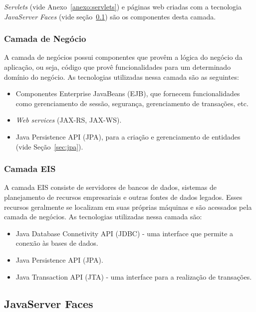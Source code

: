 \documentclass[
  10.5pt,				  %
	openright,			%
	twoside,			  %
  a5paper,
  chapter=TITLE,	%
	section=TITLE,	%
  hyphens,        %
	english,        %
	brazil          %
]{abntex2}
\begin{document}
\emph{Servlets} (vide Anexo~\ref{anexo:servlets}) e páginas web criadas com a tecnologia \emph{JavaServer Faces} (vide seção~\ref{sec:jsf}) são os componentes desta camada. 


\subsubsection{Camada de Negócio}\label{sec:camada-negocio}
A camada de negócios possui componentes que provêm a lógica do negócio da aplicação, ou seja, código que provê funcionalidades para um determinado domínio do negócio. As tecnologias utilizadas nessa camada são as seguintes:
\begin{itemize}
  \item Componentes Enterprise JavaBeans (EJB), que fornecem funcionalidades como gerenciamento de sessão, segurança, gerenciamento de transações, etc.
  \item \emph{Web services} (JAX-RS, JAX-WS).
  \item Java Persistence API (JPA), para a criação e gerenciamento de entidades (vide Seção~\ref{sec:jpa}).
\end{itemize}


\subsubsection{Camada EIS}

A camada EIS consiste de servidores de bancos de dados, sistemas de planejamento de recursos empresariais e outras fontes de dados legados. Esses recursos geralmente se localizam em suas próprias máquinas e são acessados pela camada de negócios. As tecnologias utilizadas nessa camada são:
\begin{itemize}
  \item Java Database Connetivity API (JDBC) - uma interface que permite a conexão às bases de dados.
  \item Java Persistence API (JPA).
  \item Java Transaction API (JTA) - uma interface para a realização de transações.
\end{itemize}

\subsection{JavaServer Faces}\label{sec:jsf}
\end{document}
